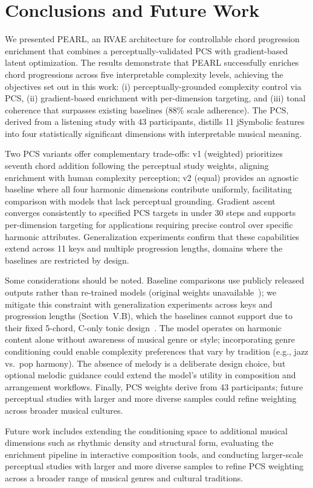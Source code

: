 \documentclass[conference]{IEEEtran}
\begin{document}
\section{Conclusions and Future Work}

We presented PEARL, an RVAE architecture for controllable chord progression enrichment that combines a perceptually-validated PCS with gradient-based latent optimization. The results demonstrate that PEARL successfully enriches chord progressions across five interpretable complexity levels, achieving the objectives set out in this work: (i) perceptually-grounded complexity control via PCS, (ii) gradient-based enrichment with per-dimension targeting, and (iii) tonal coherence that surpasses existing baselines (88\% scale adherence). The PCS, derived from a listening study with 43 participants, distills 11 jSymbolic features into four statistically significant dimensions with interpretable musical meaning.

Two PCS variants offer complementary trade-offs: v1 (weighted) prioritizes seventh chord addition following the perceptual study weights, aligning enrichment with human complexity perception; v2 (equal) provides an agnostic baseline where all four harmonic dimensions contribute uniformly, facilitating comparison with models that lack perceptual grounding. Gradient ascent converges consistently to specified PCS targets in under 30 steps and supports per-dimension targeting for applications requiring precise control over specific harmonic attributes. Generalization experiments confirm that these capabilities extend across 11 keys and multiple progression lengths, domains where the baselines are restricted by design.

Some considerations should be noted. Baseline comparisons use publicly released outputs rather than re-trained models (original weights unavailable~\cite{rvaeresources}); we mitigate this constraint with generalization experiments across keys and progression lengths (Section~V.B), which the baselines cannot support due to their fixed 5-chord, C-only tonic design~\cite{comanducci2023vae}. The model operates on harmonic content alone without awareness of musical genre or style; incorporating genre conditioning could enable complexity preferences that vary by tradition (e.g., jazz vs.\ pop harmony). The absence of melody is a deliberate design choice, but optional melodic guidance could extend the model's utility in composition and arrangement workflows. Finally, PCS weights derive from 43 participants; future perceptual studies with larger and more diverse samples could refine weighting across broader musical cultures.

Future work includes extending the conditioning space to additional musical dimensions such as rhythmic density and structural form, evaluating the enrichment pipeline in interactive composition tools, and conducting larger-scale perceptual studies with larger and more diverse samples to refine PCS weighting across a broader range of musical genres and cultural traditions.



\end{document}

